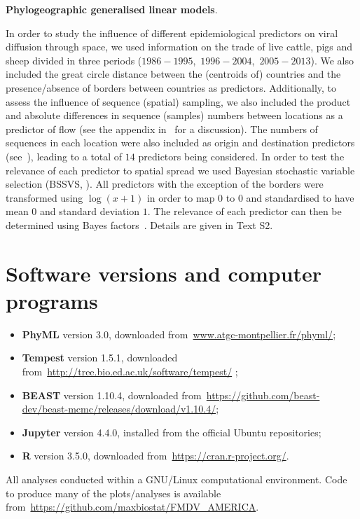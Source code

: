 \documentclass[10pt]{article}
\begin{document}
\textbf{Phylogeographic generalised linear models}.

In order to study the influence of different epidemiological predictors on viral diffusion through space, we used information on the trade of live cattle, pigs and sheep divided in three periods ($1986-1995$,~$1996-2004$,~$2005-2013$).
We also included the great circle distance between the (centroids of) countries and the presence/absence of borders between countries as predictors.
Additionally, to assess the influence of sequence (spatial) sampling, we also included the product and absolute differences in sequence (samples) numbers between locations as a predictor of flow (see the appendix in~\cite{Lemey2014} for a discussion).
The numbers of sequences in each location were also included as origin and destination predictors (see~\cite{Dudas2017}), leading to a total of $14$ predictors being considered.
In order to test the relevance of each predictor to spatial spread we used Bayesian stochastic variable selection (BSSVS, \cite{Lemey2009}).
All predictors with the exception of the borders were transformed using $\log(x +1)$ in order to map $0$ to $0$ and standardised to have mean $0$ and standard deviation $1$.
The relevance of each predictor can then be determined using Bayes factors~\citep{KassRaftery1995,Lemey2009,Lemey2014}.
Details are given in Text S2.

\section*{Software versions and computer programs}

\begin{itemize}
 \item \textbf{PhyML} version 3.0, downloaded from~\url{www.atgc-montpellier.fr/phyml/};
 \item \textbf{Tempest} version 1.5.1, downloaded from~\url{http://tree.bio.ed.ac.uk/software/tempest/}  ;
 \item \textbf{BEAST} version 1.10.4, downloaded from~\url{https://github.com/beast-dev/beast-mcmc/releases/download/v1.10.4/};
 \item  \textbf{Jupyter} version 4.4.0, installed from the official Ubuntu repositories;
 \item \textbf{R} version 3.5.0, downloaded from~\url{https://cran.r-project.org/}.
\end{itemize}

All analyses conducted within a GNU/Linux computational environment.
Code to produce many of the plots/analyses is available from~\url{https://github.com/maxbiostat/FMDV_AMERICA}.
\end{document}
